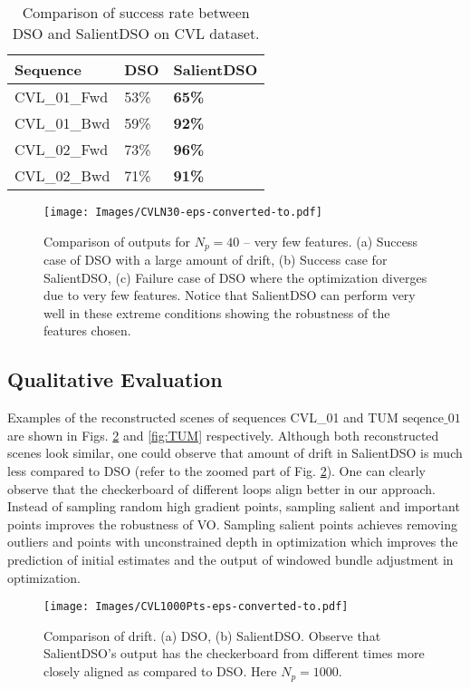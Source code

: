 \documentclass[letterpaper, 10 pt, conference]{ieeeconf}  %
\begin{document}
\begin{table}[t!]
\centering
\caption{Comparison of success rate between DSO and SalientDSO on CVL dataset.}
\label{table:CVL}
\begin{tabular}{lll}
\hline
 Sequence   & DSO & SalientDSO \\ \hline
CVL\_01\_Fwd & 53\%  & \textbf{65\%}         \\
CVL\_01\_Bwd & 59\%  & \textbf{92\%}         \\
CVL\_02\_Fwd & 73\%  & \textbf{96\%}         \\
CVL\_02\_Bwd & 71\%  & \textbf{91\%}         \\\hline
\end{tabular}
\end{table}

\begin{figure}[t!]
    \centering
    \texttt{[image: Images/CVLN30-eps-converted-to.pdf]}
    \caption{Comparison of outputs for $N_p=40$ -- very few features. (a) Success case of DSO with a large amount of drift, (b) Success case for SalientDSO,  (c) Failure case of DSO where the optimization diverges due to very few features. Notice that SalientDSO can perform very well in these extreme conditions showing the robustness of the features chosen.}
    \label{fig:CVL_N30}
\end{figure}

\subsection{Qualitative Evaluation}
Examples of the reconstructed scenes of sequences CVL\_01 and TUM $\text{seqence}\_01$ are shown in Figs. \ref{fig:CVL1000Pts} and \ref{fig:TUM} respectively. Although both reconstructed scenes look similar, one could observe that amount of drift in SalientDSO is much less compared to DSO (refer to the zoomed part of  Fig. \ref{fig:CVL1000Pts}). One can clearly observe that the checkerboard of different loops align better in our approach. Instead of sampling random high gradient points, sampling salient and important points improves the robustness of VO. Sampling salient points achieves removing outliers and points with unconstrained depth in optimization which improves the prediction of initial estimates and the output of windowed bundle adjustment in optimization.

\begin{figure}[t!]
    \centering
    \texttt{[image: Images/CVL1000Pts-eps-converted-to.pdf]}
    \caption{Comparison of drift. (a) DSO, (b) SalientDSO. Observe that SalientDSO's output has the checkerboard from different times more closely aligned as compared to DSO. Here $N_p=1000$.}
    \label{fig:CVL1000Pts}
\end{figure}
\end{document}
